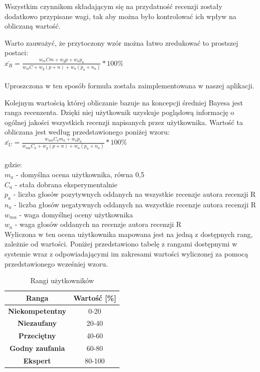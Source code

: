 Wszystkim czynnikom składającym się na przydatność recenzji zostały dodatkowo przypisane wagi, tak aby można było kontrolować ich wpływ na obliczaną wartość.

Warto zauważyć, że przytoczony wzór można łatwo zredukować to prostszej postaci:\\

$\bar{x_{R}}=\frac{w_{m}Cm+w_{g}{p}+w_{a}p_{a}}{w_{m}C+w_{g}(p+n)+w_{a}(p_{a}+n_{a})}*100\%$\\\\

Uproszczona w ten sposób formuła została zaimplementowana w naszej aplikacji.

Kolejnym wartością której obliczanie bazuje na koncepcji średniej Bayesa jest ranga recenzenta. Dzięki niej użytkownik uzyskuje poglądową informację o ogólnej jakości wszystkich recenzji napisanych przez użytkownika. Wartość ta obliczana jest według przedstawionego poniżej wzoru:\\

$\bar{x_{U}}=\frac{w_{ma}C_{a}m_{a}+w_{a}p_{a}}{w_{ma}C_{a}+w_{g}(p+n)+w_{a}(p_{a}+n_{a})}*100\%$\\\\
gdzie:\\
$m_{a}$ - domyślna ocena użytkownika, równa 0,5\\
$C_{a}$ - stała dobrana eksperymentalnie\\
$p_{a}$ - liczba głosów pozytywnych oddanych na wszystkie recenzje autora recenzji R\\
$n_{a}$ - liczba głosów negatywnych oddanych na wszystkie recenzje autora recenzji R\\
$w_{ma}$ - waga domyślnej oceny użytkownika\\
$w_{a}$ - waga głosów oddanych na recenzje autora recenzji R\\

Wyliczona w ten ocena użytkownika mapowana jest na jedną z dostępnych rang, zależnie od wartości. Poniżej przedstawiono tabelę z rangami dostępnymi w systemie wraz z odpowiadającymi im zakresami wartości wyliczonej za pomocą przedstawionego wcześniej wzoru.

\begin{table}[!h]
\centering
\begin{tabular}{|c||c|}  
\hline
\textbf{Ranga} & \textbf{Wartość [\%]} \\
\hline\hline
\textbf{Niekompetentny} & 0-20 \\  
\hline
\textbf{Niezaufany} & 20-40 \\  
\hline
\textbf{Przeciętny} & 40-60 \\  
\hline
\textbf{Godny zaufania} & 60-80 \\  
\hline
\textbf{Ekspert} & 80-100 \\  
\hline
\end{tabular}
\caption{Rangi użytkowników}
\end{table}




